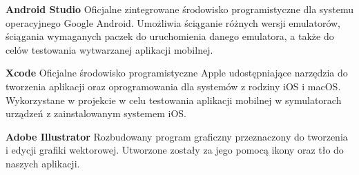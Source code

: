 \medskip

\textbf{Android Studio} Oficjalne zintegrowane środowisko programistyczne dla systemu operacyjnego Google Android. Umożliwia ściąganie różnych wersji emulatorów, ściągania wymaganych paczek do uruchomienia danego emulatora, a także do celów testowania wytwarzanej aplikacji mobilnej.

\medskip

\textbf{Xcode} Oficjalne środowisko programistyczne Apple udostępniające narzędzia do tworzenia aplikacji oraz oprogramowania dla systemów z rodziny iOS i macOS. Wykorzystane w projekcie w celu testowania aplikacji mobilnej w symulatorach urządzeń z zainstalowanym systemem iOS.

\medskip

\textbf{Adobe Illustrator} Rozbudowany program graficzny przeznaczony do tworzenia i edycji grafiki wektorowej. Utworzone zostały za jego pomocą ikony oraz tło do naszych aplikacji.

